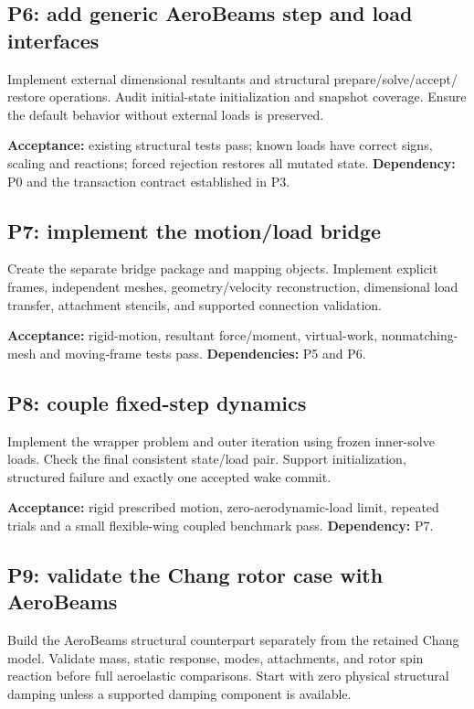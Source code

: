\documentclass[11pt,a4paper]{article}
\begin{document}
\subsection{P6: add generic AeroBeams step and load interfaces}

Implement external dimensional resultants and structural prepare/solve/accept/
restore operations. Audit initial-state initialization and snapshot coverage.
Ensure the default behavior without external loads is preserved.

\textbf{Acceptance:} existing structural tests pass; known loads have correct
signs, scaling and reactions; forced rejection restores all mutated state.
\textbf{Dependency:} P0 and the transaction contract established in P3.

\subsection{P7: implement the motion/load bridge}

Create the separate bridge package and mapping objects. Implement explicit
frames, independent meshes, geometry/velocity reconstruction, dimensional load
transfer, attachment stencils, and supported connection validation.

\textbf{Acceptance:} rigid-motion, resultant force/moment, virtual-work,
nonmatching-mesh and moving-frame tests pass.
\textbf{Dependencies:} P5 and P6.

\subsection{P8: couple fixed-step dynamics}

Implement the wrapper problem and outer iteration using frozen inner-solve
loads. Check the final consistent state/load pair. Support initialization,
structured failure and exactly one accepted wake commit.

\textbf{Acceptance:} rigid prescribed motion, zero-aerodynamic-load limit,
repeated trials and a small flexible-wing coupled benchmark pass.
\textbf{Dependency:} P7.

\subsection{P9: validate the Chang rotor case with AeroBeams}

Build the AeroBeams structural counterpart separately from the retained Chang
model. Validate mass, static response, modes, attachments, and rotor spin
reaction before full aeroelastic comparisons. Start with zero physical
structural damping unless a supported damping component is available.
\end{document}
